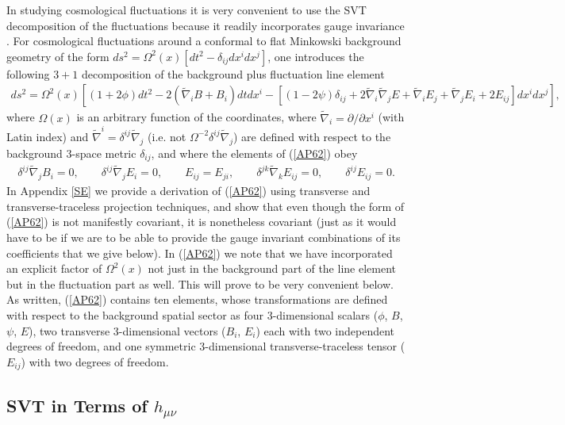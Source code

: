 \documentclass[aps]{revtex4}
\begin{document}
In studying cosmological fluctuations it is very convenient to use the SVT decomposition of the fluctuations because it readily incorporates gauge  invariance  \cite{Bardeen1980}. For cosmological fluctuations around a conformal to flat Minkowski background geometry of the form $ds^2=\Omega^2(x)[dt^2-\delta_{ij}dx^idx^j]$, one introduces the following $3+1$ decomposition of the background plus fluctuation line element 
%
\begin{eqnarray}
ds^2 = \Omega^2(x) \left[ (1+2\phi) dt^2 -2(\tilde{\nabla}_i B +B_i)dt dx^i - [(1-2\psi)\delta_{ij} +2\tilde{\nabla}_i\tilde{\nabla}_j E + \tilde{\nabla}_i E_j + \tilde{\nabla}_j E_i + 2E_{ij}]dx^i dx^j\right],
\label{AP62}
\end{eqnarray}
%
where $\Omega(x)$ is an arbitrary function of the coordinates, where $\tilde{\nabla}_i=\partial/\partial x^i$ (with Latin index) and  $\tilde{\nabla}^i=\delta^{ij}\tilde{\nabla}_j$ (i.e. not $\Omega^{-2}\delta^{ij}\tilde{\nabla}_j$) are defined with respect to the background 3-space metric $\delta_{ij}$, and where the elements of (\ref{AP62}) obey
%
\begin{eqnarray}
\delta^{ij}\tilde{\nabla}_j B_i = 0,\qquad \delta^{ij}\tilde{\nabla}_j E_i = 0, \qquad E_{ij}=E_{ji},\qquad \delta^{jk}\tilde{\nabla}_kE_{ij} = 0, \qquad \delta^{ij}E_{ij} = 0.
\label{AP63}
\end{eqnarray}
%
In Appendix \ref{SE} we provide a derivation of (\ref{AP62}) using transverse and transverse-traceless projection techniques, and show that even though the form of (\ref{AP62}) is not manifestly covariant, it is nonetheless covariant (just as it would have to be if we are to be able to provide the gauge invariant  combinations of its coefficients that we give below). In (\ref{AP62}) we note that we have incorporated an explicit factor of $\Omega^2(x)$ not just in the background part of the line element but in the fluctuation part as well. This will prove to be very convenient below. As written, (\ref{AP62}) contains ten elements, whose transformations are defined with respect to the background spatial sector as four 3-dimensional scalars ($\phi$, $B$, $\psi$, $E$), two transverse 3-dimensional vectors ($B_i$, $E_i$) each with two independent degrees of freedom, and one symmetric 3-dimensional transverse-traceless tensor ($E_{ij}$) with two degrees of freedom.

\subsection{SVT in Terms of $h_{\mu\nu}$}
\end{document}
